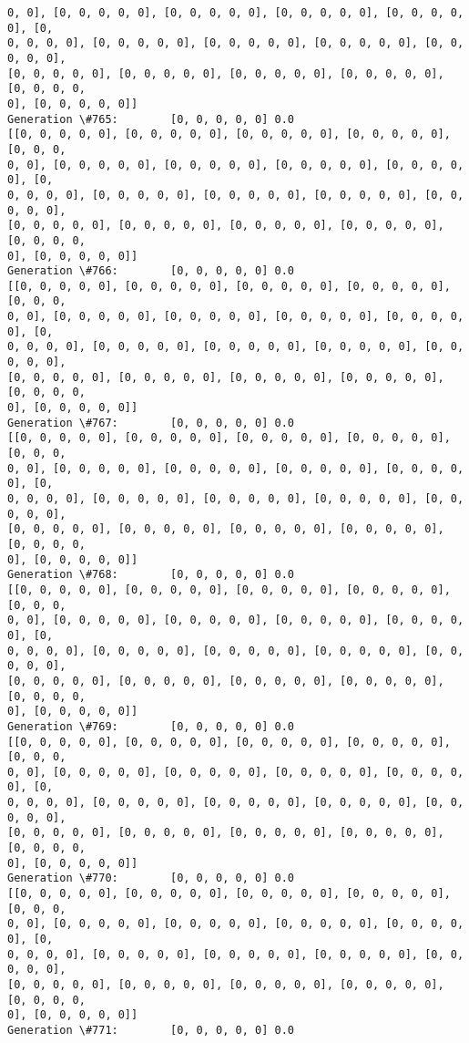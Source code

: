 \documentclass[11pt]{article}
\begin{document}
\begin{Verbatim}[commandchars=\\\{\}]
0, 0], [0, 0, 0, 0, 0], [0, 0, 0, 0, 0], [0, 0, 0, 0, 0], [0, 0, 0, 0, 0], [0,
0, 0, 0, 0], [0, 0, 0, 0, 0], [0, 0, 0, 0, 0], [0, 0, 0, 0, 0], [0, 0, 0, 0, 0],
[0, 0, 0, 0, 0], [0, 0, 0, 0, 0], [0, 0, 0, 0, 0], [0, 0, 0, 0, 0], [0, 0, 0, 0,
0], [0, 0, 0, 0, 0]]
Generation \#765:        [0, 0, 0, 0, 0] 0.0
[[0, 0, 0, 0, 0], [0, 0, 0, 0, 0], [0, 0, 0, 0, 0], [0, 0, 0, 0, 0], [0, 0, 0,
0, 0], [0, 0, 0, 0, 0], [0, 0, 0, 0, 0], [0, 0, 0, 0, 0], [0, 0, 0, 0, 0], [0,
0, 0, 0, 0], [0, 0, 0, 0, 0], [0, 0, 0, 0, 0], [0, 0, 0, 0, 0], [0, 0, 0, 0, 0],
[0, 0, 0, 0, 0], [0, 0, 0, 0, 0], [0, 0, 0, 0, 0], [0, 0, 0, 0, 0], [0, 0, 0, 0,
0], [0, 0, 0, 0, 0]]
Generation \#766:        [0, 0, 0, 0, 0] 0.0
[[0, 0, 0, 0, 0], [0, 0, 0, 0, 0], [0, 0, 0, 0, 0], [0, 0, 0, 0, 0], [0, 0, 0,
0, 0], [0, 0, 0, 0, 0], [0, 0, 0, 0, 0], [0, 0, 0, 0, 0], [0, 0, 0, 0, 0], [0,
0, 0, 0, 0], [0, 0, 0, 0, 0], [0, 0, 0, 0, 0], [0, 0, 0, 0, 0], [0, 0, 0, 0, 0],
[0, 0, 0, 0, 0], [0, 0, 0, 0, 0], [0, 0, 0, 0, 0], [0, 0, 0, 0, 0], [0, 0, 0, 0,
0], [0, 0, 0, 0, 0]]
Generation \#767:        [0, 0, 0, 0, 0] 0.0
[[0, 0, 0, 0, 0], [0, 0, 0, 0, 0], [0, 0, 0, 0, 0], [0, 0, 0, 0, 0], [0, 0, 0,
0, 0], [0, 0, 0, 0, 0], [0, 0, 0, 0, 0], [0, 0, 0, 0, 0], [0, 0, 0, 0, 0], [0,
0, 0, 0, 0], [0, 0, 0, 0, 0], [0, 0, 0, 0, 0], [0, 0, 0, 0, 0], [0, 0, 0, 0, 0],
[0, 0, 0, 0, 0], [0, 0, 0, 0, 0], [0, 0, 0, 0, 0], [0, 0, 0, 0, 0], [0, 0, 0, 0,
0], [0, 0, 0, 0, 0]]
Generation \#768:        [0, 0, 0, 0, 0] 0.0
[[0, 0, 0, 0, 0], [0, 0, 0, 0, 0], [0, 0, 0, 0, 0], [0, 0, 0, 0, 0], [0, 0, 0,
0, 0], [0, 0, 0, 0, 0], [0, 0, 0, 0, 0], [0, 0, 0, 0, 0], [0, 0, 0, 0, 0], [0,
0, 0, 0, 0], [0, 0, 0, 0, 0], [0, 0, 0, 0, 0], [0, 0, 0, 0, 0], [0, 0, 0, 0, 0],
[0, 0, 0, 0, 0], [0, 0, 0, 0, 0], [0, 0, 0, 0, 0], [0, 0, 0, 0, 0], [0, 0, 0, 0,
0], [0, 0, 0, 0, 0]]
Generation \#769:        [0, 0, 0, 0, 0] 0.0
[[0, 0, 0, 0, 0], [0, 0, 0, 0, 0], [0, 0, 0, 0, 0], [0, 0, 0, 0, 0], [0, 0, 0,
0, 0], [0, 0, 0, 0, 0], [0, 0, 0, 0, 0], [0, 0, 0, 0, 0], [0, 0, 0, 0, 0], [0,
0, 0, 0, 0], [0, 0, 0, 0, 0], [0, 0, 0, 0, 0], [0, 0, 0, 0, 0], [0, 0, 0, 0, 0],
[0, 0, 0, 0, 0], [0, 0, 0, 0, 0], [0, 0, 0, 0, 0], [0, 0, 0, 0, 0], [0, 0, 0, 0,
0], [0, 0, 0, 0, 0]]
Generation \#770:        [0, 0, 0, 0, 0] 0.0
[[0, 0, 0, 0, 0], [0, 0, 0, 0, 0], [0, 0, 0, 0, 0], [0, 0, 0, 0, 0], [0, 0, 0,
0, 0], [0, 0, 0, 0, 0], [0, 0, 0, 0, 0], [0, 0, 0, 0, 0], [0, 0, 0, 0, 0], [0,
0, 0, 0, 0], [0, 0, 0, 0, 0], [0, 0, 0, 0, 0], [0, 0, 0, 0, 0], [0, 0, 0, 0, 0],
[0, 0, 0, 0, 0], [0, 0, 0, 0, 0], [0, 0, 0, 0, 0], [0, 0, 0, 0, 0], [0, 0, 0, 0,
0], [0, 0, 0, 0, 0]]
Generation \#771:        [0, 0, 0, 0, 0] 0.0

\end{Verbatim}
\end{document}
